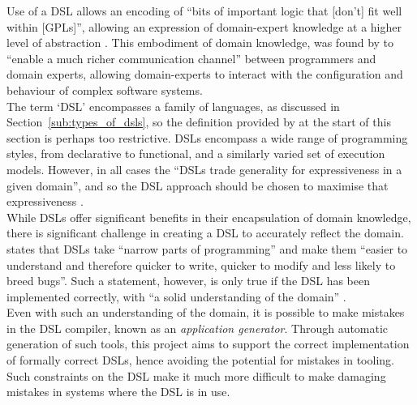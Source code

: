Use of a DSL allows an encoding of ``bits of important logic that [don't] fit well within [GPLs]'', allowing an expression of domain-expert knowledge at a higher level of abstraction \citep{fowler2010domain,van2000domain}. 
This embodiment of domain knowledge, was found by \citet{fowler2010domain} to ``enable a much richer communication channel'' between programmers and domain experts, allowing domain-experts to interact with the configuration and behaviour of complex software systems. \\

The term `DSL' encompasses a family of languages, as discussed in Section~\ref{sub:types_of_dsls}, so the definition provided by \citet{van2000domain} at the start of this section is perhaps too restrictive. 
DSLs encompass a wide range of programming styles, from declarative to functional, and a similarly varied set of execution models. 
However, in all cases the ``DSLs trade generality for expressiveness in a given domain'', and so the DSL approach should be chosen to maximise that expressiveness \citep{Mernik:2005:DDL:1118890.1118892}. \\

While DSLs offer significant benefits in their encapsulation of domain knowledge, there is significant challenge in creating a DSL to accurately reflect the domain. 
\citet{fowler2010domain} states that DSLs take ``narrow parts of programming'' and make them ``easier to understand and therefore quicker to write, quicker to modify and less likely to breed bugs''. 
Such a statement, however, is only true if the DSL has been implemented correctly, with ``a solid understanding of the domain'' \citep[pg. 1]{bosch1997domain}.\\

Even with such an understanding of the domain, it is possible to make mistakes in the DSL compiler, known as an \textit{application generator}.
Through automatic generation of such tools, this project aims to support the correct implementation of formally correct DSLs, hence avoiding the potential for mistakes in tooling. 
Such constraints on the DSL make it much more difficult to make damaging mistakes in systems where the DSL is in use. 


